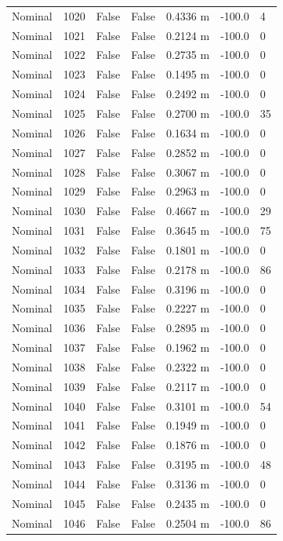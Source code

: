 \documentclass[11pt,a4paper,oneside]{book}
\begin{document}
\begin{longtable}{l l l l l l l}
Nominal & 1020 & False & False & 0.4336 m & -100.0 & 4 \\
Nominal & 1021 & False & False & 0.2124 m & -100.0 & 0 \\
Nominal & 1022 & False & False & 0.2735 m & -100.0 & 0 \\
Nominal & 1023 & False & False & 0.1495 m & -100.0 & 0 \\
Nominal & 1024 & False & False & 0.2492 m & -100.0 & 0 \\
Nominal & 1025 & False & False & 0.2700 m & -100.0 & 35 \\
Nominal & 1026 & False & False & 0.1634 m & -100.0 & 0 \\
Nominal & 1027 & False & False & 0.2852 m & -100.0 & 0 \\
Nominal & 1028 & False & False & 0.3067 m & -100.0 & 0 \\
Nominal & 1029 & False & False & 0.2963 m & -100.0 & 0 \\
Nominal & 1030 & False & False & 0.4667 m & -100.0 & 29 \\
Nominal & 1031 & False & False & 0.3645 m & -100.0 & 75 \\
Nominal & 1032 & False & False & 0.1801 m & -100.0 & 0 \\
Nominal & 1033 & False & False & 0.2178 m & -100.0 & 86 \\
Nominal & 1034 & False & False & 0.3196 m & -100.0 & 0 \\
Nominal & 1035 & False & False & 0.2227 m & -100.0 & 0 \\
Nominal & 1036 & False & False & 0.2895 m & -100.0 & 0 \\
Nominal & 1037 & False & False & 0.1962 m & -100.0 & 0 \\
Nominal & 1038 & False & False & 0.2322 m & -100.0 & 0 \\
Nominal & 1039 & False & False & 0.2117 m & -100.0 & 0 \\
Nominal & 1040 & False & False & 0.3101 m & -100.0 & 54 \\
Nominal & 1041 & False & False & 0.1949 m & -100.0 & 0 \\
Nominal & 1042 & False & False & 0.1876 m & -100.0 & 0 \\
Nominal & 1043 & False & False & 0.3195 m & -100.0 & 48 \\
Nominal & 1044 & False & False & 0.3136 m & -100.0 & 0 \\
Nominal & 1045 & False & False & 0.2435 m & -100.0 & 0 \\
Nominal & 1046 & False & False & 0.2504 m & -100.0 & 86 \\

\end{longtable}
\end{document}
